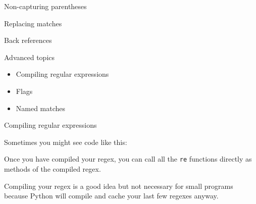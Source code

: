 \documentclass{beamer}
\begin{document}
\begin{frame}{Non-capturing parentheses}

\end{frame}

\begin{frame}{Replacing matches}

\end{frame}

\begin{frame}{Back references}

\end{frame}

\begin{frame}{Advanced topics}

\begin{itemize}
 \item Compiling regular expressions
 \item Flags
 \item Named matches
\end{itemize}

\end{frame}

\begin{frame}{Compiling regular expressions}

Sometimes you might see code like this:



{\small Once you have compiled your regex, you can call all the \lstinline$re$ functions
directly as methods of the compiled regex. }

\bigskip

{\small Compiling your regex is a good idea but not necessary for small
programs because Python will compile and cache your last few regexes anyway.}

\end{frame}
\end{document}
